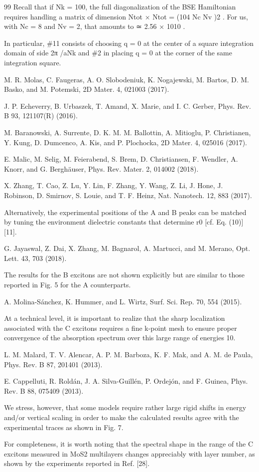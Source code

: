 \documentclass[11pt,a4paper]{ctexart}
\begin{document}
\begin{thebibliography}{99}
 Recall that if Nk = 100, the full diagonalization of the BSE Hamiltonian requires handling a matrix of dimension Ntot × Ntot = (104 Nc Nv )2 . For us, with Nc = 8 and Nv = 2, that amounts to ≃ 2.56 × 1010 .

 In particular, \#11 consists of choosing q = 0 at the center of a square integration domain of side 2π /aNk and \#2 in placing q = 0 at the corner of the same integration square.

 M. R. Molas, C. Faugeras, A. O. Slobodeniuk, K. Nogajewski, M. Bartos, D. M. Basko, and M. Potemski, 2D Mater. 4, 021003 (2017).

 J. P. Echeverry, B. Urbaszek, T. Amand, X. Marie, and I. C. Gerber, Phys. Rev. B 93, 121107(R) (2016).

 M. Baranowski, A. Surrente, D. K. M. M. Ballottin, A. Mitioglu, P. Christianen, Y. Kung, D. Dumcenco, A. Kis, and P. Plochocka, 2D Mater. 4, 025016 (2017).

 E. Malic, M. Selig, M. Feierabend, S. Brem, D. Christiansen, F. Wendler, A. Knorr, and G. Berghäuser, Phys. Rev. Mater. 2, 014002 (2018).

 X. Zhang, T. Cao, Z. Lu, Y. Lin, F. Zhang, Y. Wang, Z. Li, J. Hone, J. Robinson, D. Smirnov, S. Louie, and T. F. Heinz, Nat. Nanotech. 12, 883 (2017).

 Alternatively, the experimental positions of the A and B peaks can be matched by tuning the environment dielectric constants that determine r0 [cf. Eq. (10)] [11].

 G. Jayaswal, Z. Dai, X. Zhang, M. Bagnarol, A. Martucci, and M. Merano, Opt. Lett. 43, 703 (2018).

 The results for the B excitons are not shown explicitly but are similar to those reported in Fig. 5 for the A counterparts.

 A. Molina-Sánchez, K. Hummer, and L. Wirtz, Surf. Sci. Rep. 70, 554 (2015).

 At a technical level, it is important to realize that the sharp localization associated with the C excitons requires a fine k-point mesh to ensure proper convergence of the absorption spectrum over this large range of energies 10.

 L. M. Malard, T. V. Alencar, A. P. M. Barboza, K. F. Mak, and A. M. de Paula, Phys. Rev. B 87, 201401 (2013).

 E. Cappelluti, R. Roldán, J. A. Silva-Guillén, P. Ordejón, and F. Guinea, Phys. Rev. B 88, 075409 (2013).

 We stress, however, that some models require rather large rigid shifts in energy and/or vertical scaling in order to make the calculated results agree with the experimental traces as shown in Fig. 7.

 For completeness, it is worth noting that the spectral shape in the range of the C excitons measured in MoS2 multilayers changes appreciably with layer number, as shown by the experiments reported in Ref. [28].
\end{thebibliography}
\end{document}
